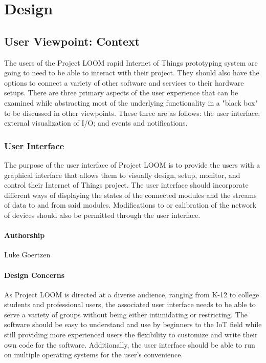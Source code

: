 \documentclass[onecolumn, draftclsnofoot,10pt, compsoc]{IEEEtran}
\begin{document}
\section{Design}
\subsection{User Viewpoint: Context}
    The users of the Project LOOM rapid Internet of Things prototyping system are going to need to be able to interact with their project. They should also have the options to connect a variety of other software and services to their hardware setups. There are three primary aspects of the user experience that can be examined while abstracting most of the underlying functionality in a "black box" to be discussed in other viewpoints. These three are as follows: the user interface; external visualization of I/O; and events and notifications.

\subsubsection{User Interface}
    The purpose of the user interface of Project LOOM is to provide the users with a graphical interface that allows them to visually design, setup, monitor, and control their Internet of Things project. The user interface should incorporate different ways of displaying the states of the connected modules and the streams of data to and from said modules. Modifications to or calibration of the network of devices should also be permitted through the user interface.

\paragraph{Authorship}
    Luke Goertzen

\paragraph{Design Concerns}
    As Project LOOM is directed at a diverse audience, ranging from K-12 to college students and professional users, the associated user interface needs to be able to serve a variety of groups without being either intimidating or restricting. The software should be easy to understand and use by beginners to the IoT field while still providing more experienced users the flexibility to customize and write their own code for the software. Additionally, the user interface should be able to run on multiple operating systems for the user's convenience.
\end{document}

